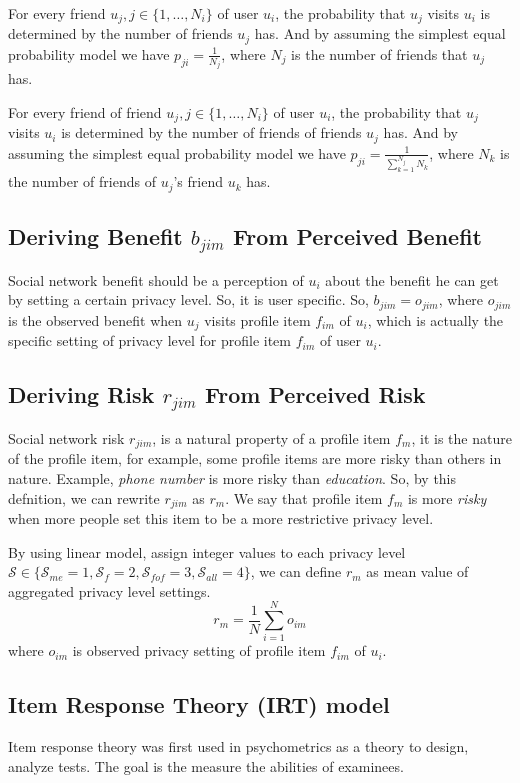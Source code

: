 \documentclass[a4paper]{article}
\begin{document}
For every friend $u_j,j\in \{1,\ldots,N_i\}$ of user $u_i$, the
probability that $u_j$ visits $u_i$ is determined by the number of
friends $u_j$ has. And by assuming the simplest equal probability
model we have $p_{ji}=\frac{1}{N_j}$, where $N_j$ is the number of
friends that $u_j$ has.

For every friend of friend $u_j,j\in \{1,\ldots,N_i\}$ of
user $u_i$, the probability that $u_j$ visits $u_i$ is determined by
the number of friends of friends $u_j$ has. And by assuming the simplest equal
probability model we have $p_{ji}=\frac{1}{\sum_{k=1}^{N_j}N_k}$,
where $N_k$ is the number of friends of $u_j$'s friend $u_k$ has.

\subsection{Deriving Benefit $b_{jim}$ From Perceived Benefit}
Social network benefit should be a perception of $u_i$ about the
benefit he can get by setting a certain privacy level. So, it is user
specific. So, $b_{jim} = o_{jim}$, where $o_{jim}$ is the observed
benefit when $u_j$ visits profile item $f_{im}$ of $u_i$, which is
actually the specific setting of privacy level for profile item
$f_{im}$ of user $u_i$.

\subsection{Deriving Risk $r_{jim}$ From Perceived Risk}
Social network risk $r_{jim}$, is a natural property of a profile item
$f_{m}$, it is the nature of the profile item, for example, some
profile items are more risky than others in nature. Example,
\emph{phone number} is more risky than \emph{education}. So, by this
defnition, we can rewrite $r_{jim}$ as $r_m$. We say that profile item
$f_m$ is more \emph{risky} when more people set this item to be a more
restrictive privacy level.

By using linear model, assign integer values to each privacy level
$\mathcal{S}\in \{\mathcal{S}_{me}=1, \mathcal{S}_{f}=2,
\mathcal{S}_{fof}=3, \mathcal{S}_{all}=4\}$, we can define $r_m$ as
mean value of aggregated privacy level settings.
\[ r_m = \frac{1}{N} \sum_{i=1}^No_{im} \]
where $o_{im}$ is observed privacy setting of profile item $f_{im}$
of $u_i$.

\subsection{Item Response Theory (IRT) model}
Item response theory was first used in psychometrics as a theory
to design, analyze tests. The goal is the measure the abilities of
examinees. 
\end{document}
